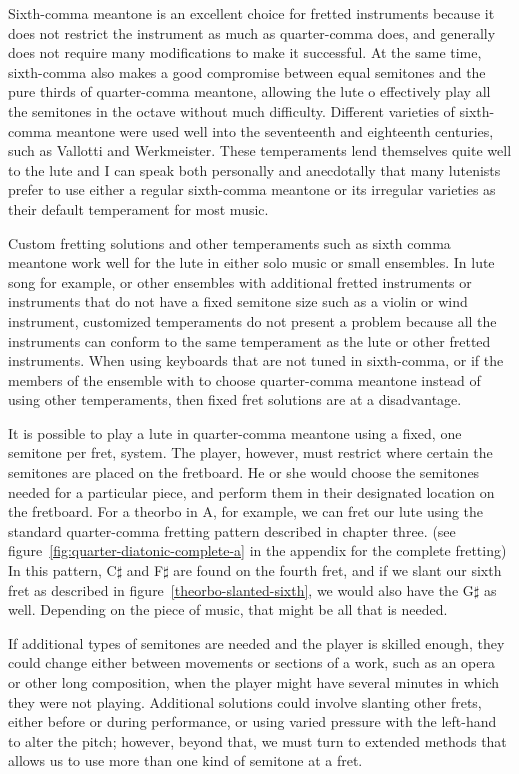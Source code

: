Sixth-comma meantone is an excellent choice for fretted instruments because it does not
restrict the instrument as much as quarter-comma does, and generally does not require
many modifications to make it successful. At the same time, sixth-comma also makes a
good compromise between equal semitones and the pure thirds of quarter-comma meantone,
allowing the lute o effectively play all the semitones in the octave without much
difficulty. Different varieties of sixth-comma meantone were used well into the
seventeenth and eighteenth centuries, such as Vallotti and Werkmeister. These
temperaments lend themselves quite well to the lute and I can speak both personally and
anecdotally that many lutenists prefer to use either a regular sixth-comma meantone or
its irregular varieties as their default temperament for most music.

Custom fretting solutions and other temperaments such as sixth comma meantone work well
for the lute in either solo music or small ensembles.  In lute song for example, or
other ensembles with additional fretted instruments or instruments that do not have a
fixed semitone size such as a violin or wind instrument, customized temperaments do not
present a problem because all the instruments can conform to the same temperament as
the lute or other fretted instruments.  When using keyboards that are not tuned in
sixth-comma, or if the members of the ensemble with to choose quarter-comma meantone
instead of using other temperaments, then fixed fret solutions are at a disadvantage.

It is possible to play a lute in quarter-comma meantone using a fixed, one semitone per
fret, system.  The player, however, must restrict where certain the semitones are
placed on the fretboard.  He or she would choose the semitones needed for a particular
piece, and perform them in their designated location on the fretboard.  For a theorbo
in A, for example, we can fret our lute using the standard quarter-comma fretting
pattern described in chapter three. (see figure~\ref{fig:quarter-diatonic-complete-a}
in the appendix for the complete fretting)  In this pattern, C$\sharp$ and F$\sharp$
are found on the fourth fret, and if we slant our sixth fret as described in
figure~\ref{theorbo-slanted-sixth}, we would also have the G$\sharp$ as well. Depending
on the piece of music, that might be all that is needed.

If additional types of semitones are needed and the player is skilled enough, they
could change either between movements or sections of a work, such as an opera or other
long composition, when the player might have several minutes in which they were not
playing. Additional solutions could involve slanting other frets, either before or
during performance, or using varied pressure with the left-hand to alter the pitch;
however, beyond that, we must turn to extended methods that allows us to use more than
one kind of semitone at a fret.

